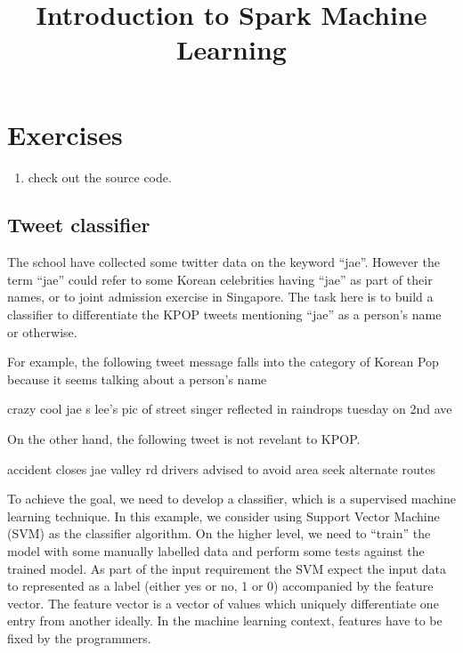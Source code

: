 \documentclass[10pt]{article}
\title{Introduction to Spark Machine Learning}
\begin{document}
\maketitle \makeatactive
\thispagestyle{fancy}





\section{Exercises }

\begin{enumerate}
\item check out the source code.
\end{enumerate}

\subsection{Tweet classifier}

The school have collected some twitter data on the keyword ``jae''. 
However the term ``jae'' could refer to some 
Korean celebrities having ``jae'' as part of their names, or to joint
admission exercise in Singapore. 
The task here is to build a classifier to differentiate the KPOP tweets
mentioning ``jae'' as a person's name or otherwise.

For example, the following tweet message falls into the category of
Korean Pop because it seems talking about a person's name 
\begin{code}
crazy cool   jae s lee's pic of street singer reflected in raindrops
 tuesday on 2nd ave  
\end{code}
%
On the other hand, the following tweet is not revelant to KPOP. 
\begin{code}
accident closes jae valley rd drivers advised to avoid area seek 
alternate routes
\end{code}
%
To achieve the goal, we need to develop a classifier, which is a
supervised machine learning technique. In this example, we consider
using Support Vector Machine (SVM) as the classifier
algorithm. On the higher level, we need to ``train'' the model with
some manually labelled data and perform some tests against the trained
model. As part of the input requirement the SVM expect the input data
to represented as a label (either yes or no, 1 or 0) accompanied by
the feature vector. The feature vector is a vector of values which
uniquely differentiate one entry from another ideally.  In the machine
learning context, features have to be fixed by the programmers. 
\end{document}
